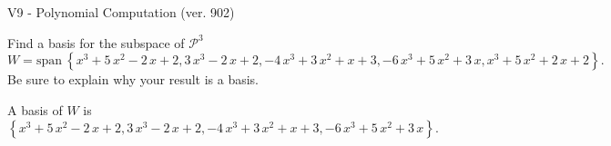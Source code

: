 \begin{exercise}
  \begin{exerciseTitle}V9 - Polynomial Computation (ver. 902)\end{exerciseTitle}
  \begin{exerciseStatement}
    Find a basis for the subspace of \(\mathcal{P}^3\) 
\[W=\mathrm{span}\ \left\{x^{3} + 5 \, x^{2} - 2 \, x + 2 , 3 \, x^{3} - 2 \, x + 2 , -4 \, x^{3} + 3 \, x^{2} + x + 3 , -6 \, x^{3} + 5 \, x^{2} + 3 \, x , x^{3} + 5 \, x^{2} + 2 \, x + 2\right\}.\]
 Be sure to explain why your result is a basis.


  \end{exerciseStatement}
  \begin{exerciseAnswer}
   A basis of \(W\) is  \(\left\{x^{3} + 5 \, x^{2} - 2 \, x + 2 , 3 \, x^{3} - 2 \, x + 2 , -4 \, x^{3} + 3 \, x^{2} + x + 3 , -6 \, x^{3} + 5 \, x^{2} + 3 \, x\right\}\).
  


  \end{exerciseAnswer}
\end{exercise}
